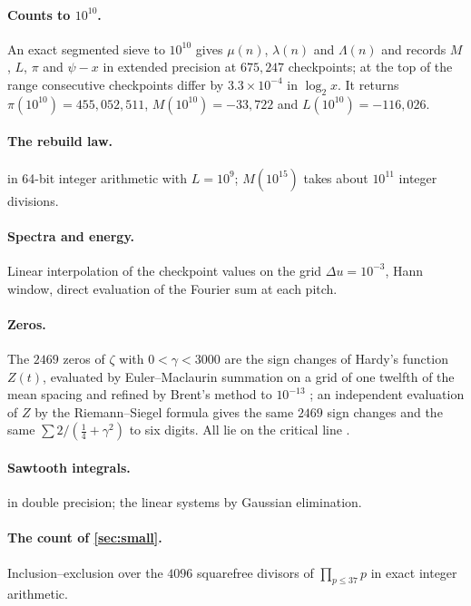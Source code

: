 \documentclass[11pt]{article}
\theoremstyle{definition}\newtheorem{definition}[theorem]{Definition}
\theoremstyle{remark}\newtheorem{remark}[theorem]{Remark}
\begin{document}
\paragraph{Counts to $10^{10}$.} An exact segmented sieve to $10^{10}$ gives $\mu(n)$, $\lambda(n)$ and $\Lambda(n)$ and records $M$, $L$, $\pi$ and $\psi-x$ in extended precision at $675{,}247$ checkpoints; at the top of the range consecutive checkpoints differ by $3.3\times10^{-4}$ in $\log_2x$. It returns $\pi(10^{10})=455{,}052{,}511$, $M(10^{10})=-33{,}722$ and $L(10^{10})=-116{,}026$.

\paragraph{The rebuild law.}  in 64-bit integer arithmetic with $L=10^9$; $M(10^{15})$ takes about $10^{11}$ integer divisions.

\paragraph{Spectra and energy.} Linear interpolation of the checkpoint values on the grid $\Delta u=10^{-3}$, Hann window, direct evaluation of the Fourier sum at each pitch.

\paragraph{Zeros.} The $2469$ zeros of $\zeta$ with $0<\gamma<3000$ are the sign changes of Hardy's function $Z(t)$, evaluated by Euler--Maclaurin summation on a grid of one twelfth of the mean spacing and refined by Brent's method to $10^{-13}$ \cite{S09}; an independent evaluation of $Z$ by the Riemann--Siegel formula gives the same $2469$ sign changes and the same $\sum2/(\frac14+\gamma^2)$ to six digits. All lie on the critical line \cite{PT}.

\paragraph{Sawtooth integrals.}  in double precision; the linear systems by Gaussian elimination.

\paragraph{The count of \cref{sec:small}.} Inclusion--exclusion over the $4096$ squarefree divisors of $\prod_{p\le37}p$ in exact integer arithmetic.
\end{document}
